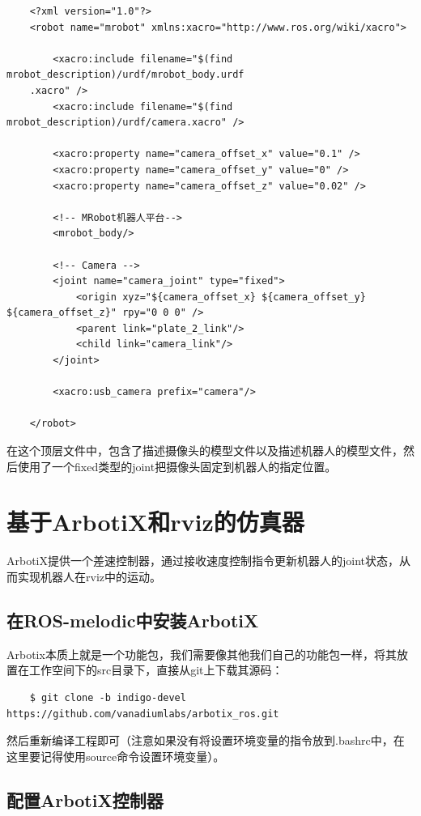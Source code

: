 \documentclass[9pt, oneside]{book}
\begin{document}
\begin{verbatim}
    <?xml version="1.0"?>
    <robot name="mrobot" xmlns:xacro="http://www.ros.org/wiki/xacro">

        <xacro:include filename="$(find mrobot_description)/urdf/mrobot_body.urdf
    .xacro" />
        <xacro:include filename="$(find mrobot_description)/urdf/camera.xacro" />

        <xacro:property name="camera_offset_x" value="0.1" />
        <xacro:property name="camera_offset_y" value="0" />
        <xacro:property name="camera_offset_z" value="0.02" />

        <!-- MRobot机器人平台-->
        <mrobot_body/>

        <!-- Camera -->
        <joint name="camera_joint" type="fixed">
            <origin xyz="${camera_offset_x} ${camera_offset_y} ${camera_offset_z}" rpy="0 0 0" />
            <parent link="plate_2_link"/>
            <child link="camera_link"/>
        </joint>

        <xacro:usb_camera prefix="camera"/>

    </robot>
\end{verbatim}

在这个顶层文件中，包含了描述摄像头的模型文件以及描述机器人的模型文件，然后使用了一个fixed类型的joint把摄像头固定到机器人的指定位置。

\section{基于ArbotiX和rviz的仿真器}

ArbotiX提供一个差速控制器，通过接收速度控制指令更新机器人的joint状态，从而实现机器人在rviz中的运动。

\subsection{在ROS-melodic中安装ArbotiX}

Arbotix本质上就是一个功能包，我们需要像其他我们自己的功能包一样，将其放置在工作空间下的src目录下，直接从git上下载其源码：

\begin{verbatim}
    $ git clone -b indigo-devel https://github.com/vanadiumlabs/arbotix_ros.git
\end{verbatim}

然后重新编译工程即可（注意如果没有将设置环境变量的指令放到.bashrc中，在这里要记得使用source命令设置环境变量）。

\subsection{配置ArbotiX控制器}
\end{document}
